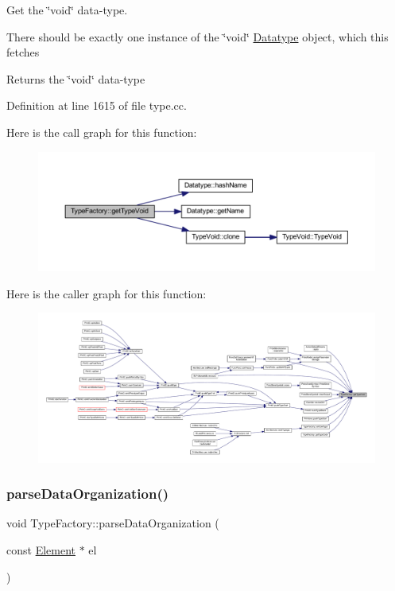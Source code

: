 Get the \char`\"{}void\char`\"{} data-\/type. 

There should be exactly one instance of the \char`\"{}void\char`\"{} \mbox{\hyperlink{class_datatype}{Datatype}} object, which this fetches \begin{DoxyReturn}{Returns}
the \char`\"{}void\char`\"{} data-\/type 
\end{DoxyReturn}


Definition at line 1615 of file type.\+cc.

Here is the call graph for this function\+:
\nopagebreak
\begin{figure}[H]
\begin{center}
\leavevmode
\includegraphics[width=350pt]{class_type_factory_ab7277908ef32101f172633ec00fbecb1_cgraph}
\end{center}
\end{figure}
Here is the caller graph for this function\+:
\nopagebreak
\begin{figure}[H]
\begin{center}
\leavevmode
\includegraphics[width=350pt]{class_type_factory_ab7277908ef32101f172633ec00fbecb1_icgraph}
\end{center}
\end{figure}
\mbox{\label{class_type_factory_a6e13c732148b6c5f78797d60e1a115f5}} 
\subsubsection{\texorpdfstring{parseDataOrganization()}{parseDataOrganization()}}
{\footnotesize\ttfamily void Type\+Factory\+::parse\+Data\+Organization (\begin{DoxyParamCaption}\item[{const \mbox{\hyperlink{class_element}{Element}} $\ast$}]{el }\end{DoxyParamCaption})}



